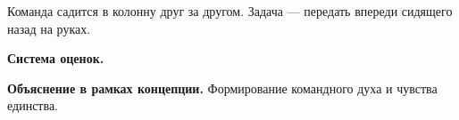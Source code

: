 
\par Команда садится в колонну друг за другом. Задача --- передать впереди сидящего назад на руках.

\par \textbf{Система оценок.}

\par \textbf{Объяснение в рамках концепции.} Формирование командного духа и чувства единства.